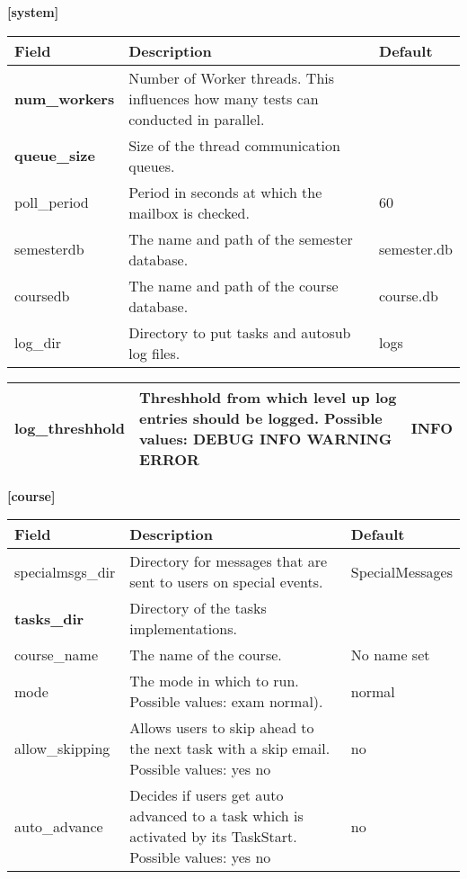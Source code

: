 {\bf [system]}\\
\begin{tabular}{|p{2.5cm}|p{8cm}|p{2.5cm}|}
\hline
{\bf Field} & {\bf Description} & {\bf Default}\\
\hline
\hline
\textbf{num\_workers} & Number of Worker threads. This influences how many tests can conducted 
	in parallel. & ~ \\
\hline
\textbf{queue\_size} & Size of the thread communication queues. & ~\\
\hline
poll\_period & Period in seconds at which the mailbox is checked. & 60\\
\hline
semesterdb & The name and path of the semester database. & semester.db\\
\hline
coursedb &  The name and path of the course database. & course.db\\
\hline
log\_dir & Directory to put tasks and autosub log files. & logs  \\
\hline
\end{tabular}
\begin{tabular}{|p{2.5cm}|p{8cm}|p{2.5cm}|}
\hline
log\_threshhold & Threshhold from which level up log entries should be logged. 
	Possible values: DEBUG INFO WARNING ERROR & INFO\\
\hline
\end{tabular}

{\bf [course]}\\
\begin{tabular}{|p{2.5cm}|p{8cm}|p{2.5cm}|}
\hline
{\bf Field} & {\bf Description} & {\bf Default}\\
\hline
\hline
specialmsgs\_dir & Directory for messages that are sent to users on special events. & 
	SpecialMessages \\
\hline
\textbf{tasks\_dir} & Directory of the tasks implementations. & ~ \\ 
\hline
course\_name & The name of the course. & No name set \\
\hline
mode & The mode in which to run. Possible values: exam normal). & normal \\ 
\hline
allow\_skipping & Allows users to skip ahead to the next task with a skip email. 
	Possible values: yes no & no \\
\hline
auto\_advance & Decides if users get auto advanced to a task which is activated by its 
	TaskStart. Possible values: yes no & no \\
\hline
\end{tabular}

